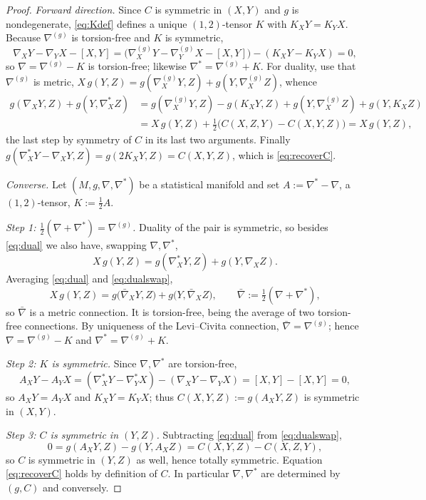 \documentclass{amsart}
\theoremstyle{definition}
\theoremstyle{remark}
\begin{document}
\begin{proof}
\emph{Forward direction.} Since $C$ is symmetric in $(X,Y)$ and $g$ is
nondegenerate, \eqref{eq:Kdef} defines a unique $(1,2)$-tensor $K$ with
$K_{X}Y=K_{Y}X$. Because $\nabla^{(g)}$ is torsion-free and $K$ is symmetric,
\[
  \nabla_{X}Y-\nabla_{Y}X-[X,Y]
   =\bigl(\nabla^{(g)}_{X}Y-\nabla^{(g)}_{Y}X-[X,Y]\bigr)-(K_{X}Y-K_{Y}X)=0,
\]
so $\nabla=\nabla^{(g)}-K$ is torsion-free; likewise $\nabla^{*}=\nabla^{(g)}+K$.
For duality, use that $\nabla^{(g)}$ is metric,
$X\,g(Y,Z)=g(\nabla^{(g)}_{X}Y,Z)+g(Y,\nabla^{(g)}_{X}Z)$, whence
\begin{align*}
  g(\nabla_{X}Y,Z)+g(Y,\nabla^{*}_{X}Z)
   &=g(\nabla^{(g)}_{X}Y,Z)-g(K_{X}Y,Z)
     +g(Y,\nabla^{(g)}_{X}Z)+g(Y,K_{X}Z)\\
   &=X\,g(Y,Z)+\tfrac12\bigl(C(X,Z,Y)-C(X,Y,Z)\bigr)=X\,g(Y,Z),
\end{align*}
the last step by symmetry of $C$ in its last two arguments. Finally
$g(\nabla^{*}_{X}Y-\nabla_{X}Y,Z)=g(2K_{X}Y,Z)=C(X,Y,Z)$, which is
\eqref{eq:recoverC}.

\emph{Converse.} Let $(M,g,\nabla,\nabla^{*})$ be a statistical manifold and set
$A:=\nabla^{*}-\nabla$, a $(1,2)$-tensor, $K:=\tfrac12 A$.

\emph{Step 1: $\tfrac12(\nabla+\nabla^{*})=\nabla^{(g)}$.} Duality of the pair is
symmetric, so besides \eqref{eq:dual} we also have, swapping $\nabla,\nabla^{*}$,
\begin{equation}\label{eq:dualswap}
  X\,g(Y,Z)=g(\nabla^{*}_{X}Y,Z)+g(Y,\nabla_{X}Z).
\end{equation}
Averaging \eqref{eq:dual} and \eqref{eq:dualswap},
\[
  X\,g(Y,Z)=g\bigl(\bar\nabla_{X}Y,Z\bigr)+g\bigl(Y,\bar\nabla_{X}Z\bigr),
  \qquad \bar\nabla:=\tfrac12(\nabla+\nabla^{*}),
\]
so $\bar\nabla$ is a metric connection. It is torsion-free, being the average of
two torsion-free connections. By uniqueness of the Levi--Civita connection,
$\bar\nabla=\nabla^{(g)}$; hence $\nabla=\nabla^{(g)}-K$ and
$\nabla^{*}=\nabla^{(g)}+K$.

\emph{Step 2: $K$ is symmetric.} Since $\nabla,\nabla^{*}$ are torsion-free,
\[
  A_{X}Y-A_{Y}X=(\nabla^{*}_{X}Y-\nabla^{*}_{Y}X)-(\nabla_{X}Y-\nabla_{Y}X)
  =[X,Y]-[X,Y]=0,
\]
so $A_{X}Y=A_{Y}X$ and $K_{X}Y=K_{Y}X$; thus $C(X,Y,Z):=g(A_{X}Y,Z)$ is symmetric
in $(X,Y)$.

\emph{Step 3: $C$ is symmetric in $(Y,Z)$.} Subtracting \eqref{eq:dual} from
\eqref{eq:dualswap},
\[
  0=g(A_{X}Y,Z)-g(Y,A_{X}Z)=C(X,Y,Z)-C(X,Z,Y),
\]
so $C$ is symmetric in $(Y,Z)$ as well, hence totally symmetric. Equation
\eqref{eq:recoverC} holds by definition of $C$. In particular $\nabla,\nabla^{*}$
are determined by $(g,C)$ and conversely.
\end{proof}
\end{document}
